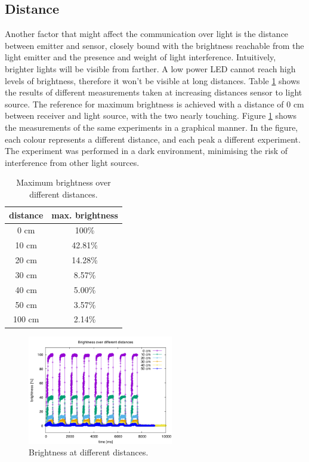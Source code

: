 \subsection{Distance}
\label{distancephy}
Another factor that might affect the communication over light is the distance between emitter and sensor, closely bound with the brightness reachable from the light emitter and the presence and weight of light interference.
Intuitively, brighter lights will be visible from farther.
A low power LED cannot reach high levels of brightness, therefore it won't be visible at long distances.
Table \ref{tab:distancesphy} shows the results of different measurements taken at increasing distances sensor to light source.
The reference for maximum brightness is achieved with a distance of 0 cm between receiver and light source, with the two nearly touching.
Figure \ref{fig:distancephy} shows the measurements of the same experiments in a graphical manner.
In the figure, each colour represents a different distance, and each peak a different experiment.
The experiment was performed in a dark environment, minimising the risk of interference from other light sources.

\begin{table}[hbt]
\centering
  \begin{tabular}{c c}
    distance & max. brightness \\
    \hline
    0 cm & 100\% \\
    10 cm & 42.81\% \\
    20 cm & 14.28\% \\
    30 cm & 8.57\% \\
    40 cm & 5.00\% \\
    50 cm & 3.57\% \\
    100 cm & 2.14\% \\
  \end{tabular}
 \caption{Maximum brightness over different distances.}
  \label{tab:distancesphy}
\end{table}

\begin{figure}[hbt]
	\centering
      \includegraphics[height=180px]{img/distancephy}
  \caption{Brightness at different distances.}
  \label{fig:distancephy}
\end{figure}

